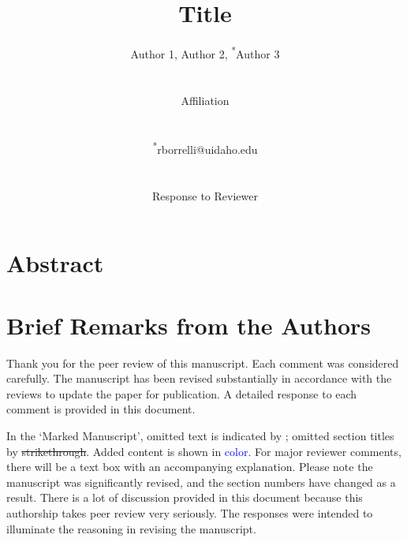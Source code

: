 \documentclass[11pt,a4paper]{article}
\newcommand{\edit}[1]{\textcolor{blue}{#1}} %
\newcommand\sk{\bgroup\markoverwith{\textcolor{red}{\rule[0.5ex]{1pt}{1pt}}}\ULon} %
\begin{document}
\begin{titlepage}
    \title{Title}
    \author{
        Author 1, 
        Author 2, 
        \textsuperscript{*}Author 3
        \\ \\ \\
        Affiliation
        \\ \\ \\
        \textsuperscript{*}rborrelli@uidaho.edu
        \\ \\ \\ 
        Response to Reviewer
    }
\clearpage %
\maketitle
\thispagestyle{empty} %
\end{titlepage}




\section*{Abstract}


\newpage


\section*{Brief Remarks from the Authors}
Thank you for the peer review of this manuscript. Each comment was considered carefully. The manuscript has been revised substantially in accordance with the reviews to update the paper for publication. A detailed response to each comment is provided in this document.

In the `Marked Manuscript', omitted text is indicated by \sk{strikethrough}; omitted section titles by \sout{strikethrough}. Added content is shown in \edit{color}. For major reviewer comments, there will be a text box with an accompanying explanation. Please note the manuscript was significantly revised, and the section numbers have changed as a result. There is a lot of discussion provided in this document because this authorship takes peer review very seriously. The responses were intended to illuminate the reasoning in revising the manuscript. 
\end{document}
